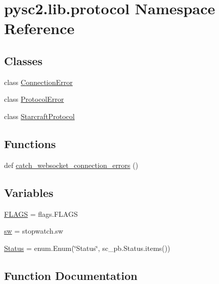 \hypertarget{namespacepysc2_1_1lib_1_1protocol}{}\section{pysc2.\+lib.\+protocol Namespace Reference}
\label{namespacepysc2_1_1lib_1_1protocol}
\subsection*{Classes}
\begin{DoxyCompactItemize}
\item 
class \mbox{\hyperlink{classpysc2_1_1lib_1_1protocol_1_1_connection_error}{Connection\+Error}}
\item 
class \mbox{\hyperlink{classpysc2_1_1lib_1_1protocol_1_1_protocol_error}{Protocol\+Error}}
\item 
class \mbox{\hyperlink{classpysc2_1_1lib_1_1protocol_1_1_starcraft_protocol}{Starcraft\+Protocol}}
\end{DoxyCompactItemize}
\subsection*{Functions}
\begin{DoxyCompactItemize}
\item 
def \mbox{\hyperlink{namespacepysc2_1_1lib_1_1protocol_a9dc3f36956ad7b672f9910dc3d7fac62}{catch\+\_\+websocket\+\_\+connection\+\_\+errors}} ()
\end{DoxyCompactItemize}
\subsection*{Variables}
\begin{DoxyCompactItemize}
\item 
\mbox{\hyperlink{namespacepysc2_1_1lib_1_1protocol_a0f9d2fb7be1ab1b9bb882c2b68046203}{F\+L\+A\+GS}} = flags.\+F\+L\+A\+GS
\item 
\mbox{\hyperlink{namespacepysc2_1_1lib_1_1protocol_a8612b29bdee56dc470fda95c8bbd8cb2}{sw}} = stopwatch.\+sw
\item 
\mbox{\hyperlink{namespacepysc2_1_1lib_1_1protocol_adfe00ba6b54424ee04479b5340d49293}{Status}} = enum.\+Enum(\char`\"{}Status\char`\"{}, sc\+\_\+pb.\+Status.\+items())
\end{DoxyCompactItemize}


\subsection{Function Documentation}
\mbox{\label{namespacepysc2_1_1lib_1_1protocol_a9dc3f36956ad7b672f9910dc3d7fac62}} 
